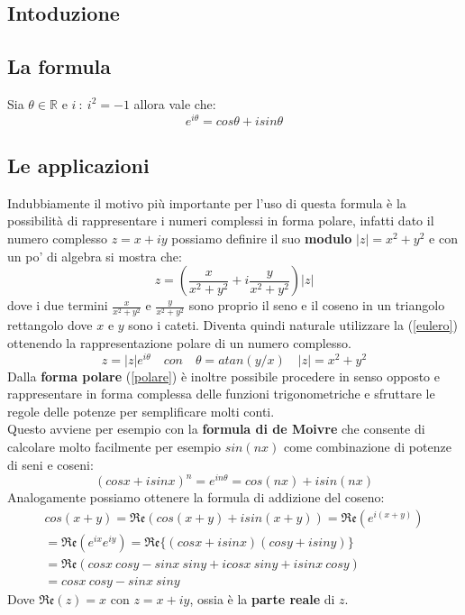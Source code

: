 \begin{multicols}{2}
	
	\section{Intoduzione}
	\subsection{La formula}
	Sia $\theta\in \mathbb{R}$ e $i\ :\ i^2=-1$ allora vale che:
	\begin{equation}
		e^{i\theta}=cos\theta+isin\theta
		\label{eulero}
	\end{equation}

    \subsection{Le applicazioni}
    Indubbiamente il motivo più importante per l'uso di questa formula è la possibilità di rappresentare i numeri complessi in forma polare, infatti dato il numero complesso $z=x+iy$ possiamo definire il suo \textbf{modulo} $|z|=x^2+y^2$ e con un po' di algebra si mostra che:
    \begin{equation*}
    	z=(\frac{x}{x^2+y^2}+i\frac{y}{x^2+y^2})|z|
    \end{equation*}
     dove i due termini $\frac{x}{x^2+y^2}$ e $\frac{y}{x^2+y^2}$ sono proprio il seno e il coseno in un triangolo rettangolo dove $x$ e $y$ sono i cateti. Diventa quindi naturale utilizzare la (\ref{eulero}) ottenendo la rappresentazione polare di un numero complesso.
     \begin{equation}
     	z=|z|e^{i\theta}\quad con \quad \theta=atan(y/x) \quad |z|=x^2+y^2
     	\label{polare}
     \end{equation}
     Dalla \textbf{forma polare} (\ref{polare}) è inoltre possibile procedere in senso opposto e rappresentare in forma complessa delle funzioni trigonometriche e sfruttare le regole delle potenze per semplificare molti conti.\\
     Questo avviene per esempio con la \textbf{formula di de Moivre} che consente di calcolare molto facilmente per esempio $sin(nx)$ come combinazione di potenze di seni e coseni:
     \begin{equation*}
     	(cosx+isinx)^n=e^{in\theta}=cos(nx)+isin(nx)
     \end{equation*}
    Analogamente possiamo ottenere la formula di addizione del coseno:
    \begin{multline*}
    	cos(x+y)=\mathfrak{Re}(cos(x+y)+isin(x+y))
    	=\mathfrak{Re}(e^{i(x+y)})\\=\mathfrak{Re}(e^{ix}e^{iy})=\mathfrak{Re}\{(cosx+isinx)(cosy+isiny)\}\\
    	=\mathfrak{Re}(cosx\ cosy-sinx\ siny+icosx\ siny+isinx\ cosy)\\
    	=cosx\ cosy-sinx\ siny
    \end{multline*}
    Dove $\mathfrak{Re}(z)=x$ con $z=x+iy$, ossia è la \textbf{parte reale} di $z$.

\end{multicols}
